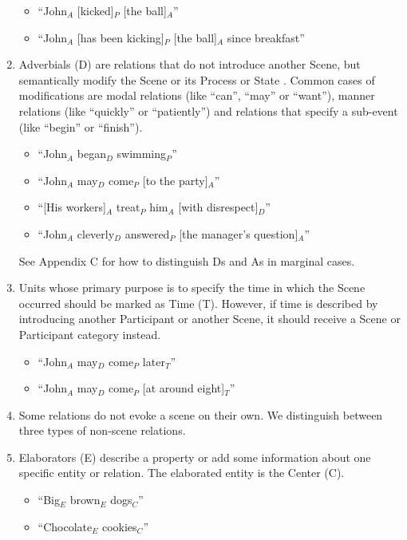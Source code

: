 \documentclass[11pt]{article}
\begin{document}
\begin{enumerate}
\begin{itemize}
\item
``John$_A$ [kicked]$_P$ [the ball]$_A$''
\item
``John$_A$ [has been kicking]$_P$ [the ball]$_A$ since breakfast''
\end{itemize}

\item
Adverbials (D) are relations that do not introduce another Scene, but semantically modify the Scene or its Process or State . Common cases of modifications are modal relations (like ``can'', ``may'' or ``want''), manner relations (like ``quickly'' or ``patiently'') and relations that specify a sub-event (like ``begin'' or ``finish'').
\begin{itemize}
\item
``John$_A$ began$_D$ swimming$_P$''
\item
``John$_A$ may$_D$ come$_P$ [to the party]$_A$''
\item
``[His workers]$_A$ treat$_P$ him$_A$ [with disrespect]$_D$''
\item
``John$_A$ cleverly$_D$ answered$_P$ [the manager's question]$_A$''
\end{itemize}

See Appendix C for how to distinguish Ds and As in marginal cases.

\item
Units whose primary purpose is to specify the time in which the Scene occurred should be marked as Time (T). However, if time is described by introducing another Participant or another Scene, it should receive a Scene or Participant category instead.

\begin{itemize}
\item ``John$_A$ may$_D$ come$_P$ later$_T$''
\item ``John$_A$ may$_D$ come$_P$ [at around eight]$_T$''
\end{itemize}

\item
Some relations do not evoke a scene on their own. We distinguish between three types of non-scene relations.

\item
Elaborators (E) describe a property or add some information about one specific entity or relation. The elaborated entity is the Center (C).

\begin{itemize}
\item ``Big$_E$ brown$_E$ dogs$_C$''
\item ``Chocolate$_E$ cookies$_C$''
\end{itemize}


\end{enumerate}
\end{document}
